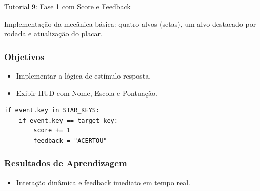 \documentclass[11pt,a4paper]{article}
\begin{document}
\newpage
\begin{boxTutorial}{Tutorial 9: Fase 1 com Score e Feedback}
\label{sec: Tutorial 9: Fase 1}

    Implementação da mecânica básica: quatro alvos (setas), um alvo destacado por rodada e atualização do placar.
    
    \subsubsection*{Objetivos}
    \begin{itemize}
    \item Implementar a lógica de estímulo-resposta.
    \item Exibir HUD com Nome, Escola e Pontuação.
    \end{itemize}
    
    \begin{verbatim}
if event.key in STAR_KEYS:
    if event.key == target_key:
        score += 1
        feedback = "ACERTOU"
    \end{verbatim}
    
    \subsubsection*{Resultados de Aprendizagem}
    \begin{itemize}
    \item Interação dinâmica e feedback imediato em tempo real.
    \end{itemize}
\end{boxTutorial}
\end{document}
